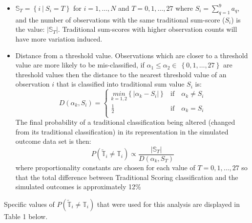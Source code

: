 \documentclass[12pt,]{article}
\providecommand{\tightlist}{%
  \setlength{\itemsep}{0pt}\setlength{\parskip}{0pt}}
\begin{document}
\begin{itemize}
\tightlist
\item
  \(\mathbb{S}_{T}=\left \{ i\ \Big | \ S_{i}=T \right \}\) for
  \(i=1,\ldots, N\) and \(T=0, 1,\ldots, 27\) where
  \(S_{i} = \sum_{q=1}^{9} a_{q}\), and the number of observations with
  the same traditional sum-score (\(S_{i}\)) is the value:
  \(|\mathbb{S}_{T}|\). Traditional sum-scores with higher observation
  counts will have more variation induced.
\item
  Distance from a threshold value. Observations which are closer to a
  threshold value are more likely to be mis-classified, if
  \(\alpha_{1} \leq \alpha_{2} \in \ \left \{ 0,1,\ldots, 27 \right \}\)
  are threshold values then the distance to the nearest threshold value
  of an observation \(i\) that is classified into traditional sum value
  \(S_{i}\) is: \[
  D\left(\alpha_{k}, S_{i}   \right)  = 
  \begin{cases}
  \underset{k=1,2}{min}\left \{ \Big | \alpha_{k}-S_{i}   \Big | \right \} &\mbox{if} \quad  \alpha_{k} \neq S_{i} \\ 
  \frac{1}{2} &\mbox{if} \quad  \alpha_{k} = S_{i} \\
  \end{cases}
  \] The final probability of a traditional classification being altered
  (changed from its traditional classification) in its representation in
  the simulated outcome data set is then:
  \[P\left(\tilde{\mathbb{T}}_{i} \neq \mathbb{T}_{i} \right) \propto \frac{|\mathbb{S}_{T}|}{D\left(\alpha_{k}, S_{T} \right) }\]
  where proportionality constants are chosen for each value of
  \(T=0,1,\ldots, 27\) so that the total difference between Traditional
  Scoring classification and the simulated outcomes is approximately
  12\%
\end{itemize}

Specific values of
\(P\left(\tilde{\mathbb{T}}_{i} \neq \mathbb{T}_{i} \right)\) that were
used for this analysis are displayed in Table 1 below.
\end{document}
